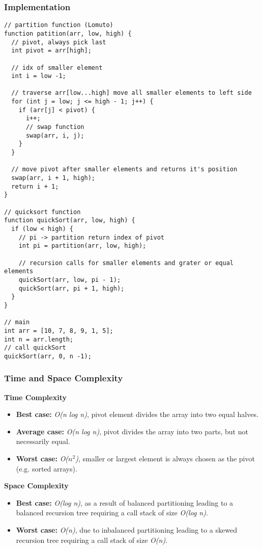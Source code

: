 \subsubsection*{Implementation}

\begin{lstlisting}[style=general]
// partition function (Lomuto)
function patition(arr, low, high) {
  // pivot, always pick last
  int pivot = arr[high];

  // idx of smaller element
  int i = low -1;

  // traverse arr[low...high] move all smaller elements to left side
  for (int j = low; j <= high - 1; j++) {
    if (arr[j] < pivot) {
      i++;
      // swap function
      swap(arr, i, j);
    }
  }

  // move pivot after smaller elements and returns it's position
  swap(arr, i + 1, high);
  return i + 1;
}

// quicksort function
function quickSort(arr, low, high) {
  if (low < high) {
    // pi -> partition return index of pivot
    int pi = partition(arr, low, high);

    // recursion calls for smaller elements and grater or equal elements
    quickSort(arr, low, pi - 1);
    quickSort(arr, pi + 1, high);
  }
}

// main
int arr = [10, 7, 8, 9, 1, 5];
int n = arr.length;
// call quickSort
quickSort(arr, 0, n -1);
\end{lstlisting}

\subsubsection*{Time and Space Complexity}

\textbf{Time Complexity}

\begin{itemize}
  \item \textbf{Best case:} \textit{O(n log n)}, pivot element divides the array into two equal halves.
  \item \textbf{Average case:} \emph{O(n log n)}, pivot divides the array into two parts, but not necessarily equal.
  \item \textbf{Worst case:} \textit{O($n^2$)}, smaller or largest element is always chosen as the pivot (e.g. sorted arrays).
\end{itemize}

\textbf{Space Complexity}

\begin{itemize}
  \item \textbf{Best case:} \textit{O(log n)}, as a result of balanced partitioning leading to a balanced recursion tree requiring a call stack of size \textit{O(log n)}.
  \item \textbf{Worst case:} \textit{O(n)}, due to inbalanced partitioning leading to a skewed recursion tree requiring a call stack of size \textit{O(n)}.
\end{itemize}

